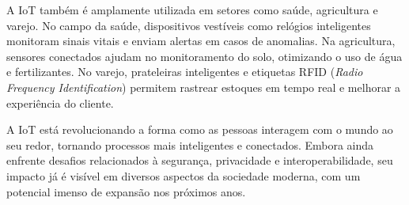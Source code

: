 A IoT também é amplamente utilizada em setores como saúde, agricultura e varejo. No campo da saúde, dispositivos vestíveis como relógios inteligentes monitoram sinais vitais e enviam alertas em casos de anomalias. Na agricultura, sensores conectados ajudam no monitoramento do solo, otimizando o uso de água e fertilizantes. No varejo, prateleiras inteligentes e etiquetas RFID (\textit{Radio Frequency Identification}) permitem rastrear estoques em tempo real e melhorar a experiência do cliente.

A IoT está revolucionando a forma como as pessoas interagem com o mundo ao seu redor, tornando processos mais inteligentes e conectados. Embora ainda enfrente desafios relacionados à segurança, privacidade e interoperabilidade, seu impacto já é visível em diversos aspectos da sociedade moderna, com um potencial imenso de expansão nos próximos anos.



